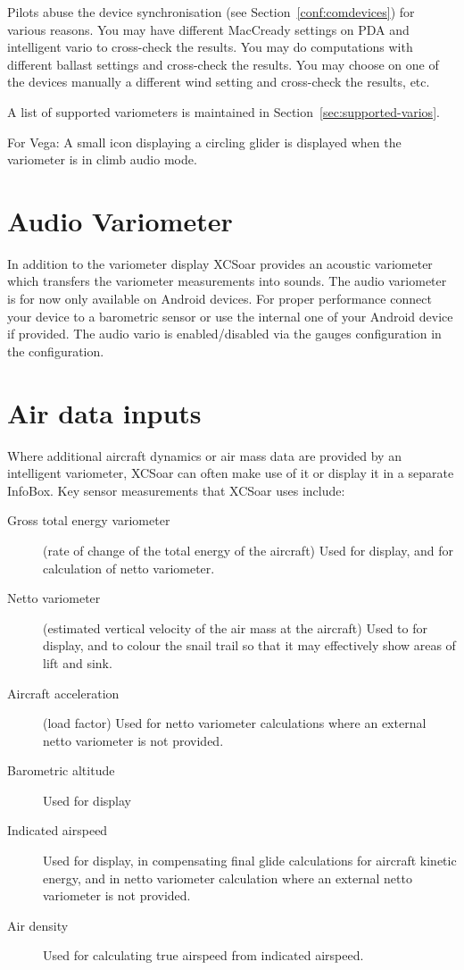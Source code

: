 Pilots abuse the device synchronisation (see Section~\ref{conf:comdevices}) for various
reasons. You may have  different MacCready settings on PDA and intelligent vario
to cross-check the results. You may do computations with different ballast 
settings and cross-check the results. You may choose on one of the devices
manually a different wind setting and cross-check the results, etc.

A list of supported variometers is maintained in
Section~\ref{sec:supported-varios}.

For Vega: A small icon displaying a circling glider is displayed when
the variometer is in climb audio mode.

\section{Audio Variometer}

In addition to the variometer display XCSoar provides an acoustic variometer which transfers the 
variometer measurements into sounds. The audio variometer is for now only available
on Android devices. For proper performance connect your device to a barometric sensor or use the
internal one of your Android device if provided.
The audio vario is enabled/disabled via the gauges configuration in the configuration.


\section{Air data inputs}

Where additional aircraft dynamics or air mass data are provided by an
intelligent variometer, XCSoar can often make use of it or display it
in a separate InfoBox.  Key sensor measurements that XCSoar uses include:
\begin{description}
\item[Gross total energy variometer] (rate of change of the total energy of
 the aircraft)  Used for display, and for calculation of netto variometer.
\item[Netto variometer] (estimated vertical velocity of the air mass at
 the aircraft)  Used to for display, and to colour the snail trail
 so that it may effectively show areas of lift and sink.
\item[Aircraft acceleration] (load factor)  Used for netto variometer
  calculations where an external netto variometer is not provided.
\item[Barometric altitude] Used for display
\item[Indicated airspeed] Used for display, in compensating final glide
  calculations for aircraft kinetic energy, and in netto variometer
  calculation where an external netto variometer is not provided.
\item[Air density] Used for calculating true airspeed from indicated
  airspeed.
\end{description}

